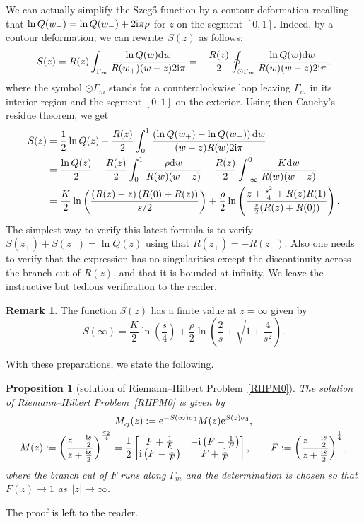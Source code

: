 \documentclass[10pt,a4paper]{amsart}
\numberwithin{equation}{section}
\newtheorem{Proposition}[Theorem]{Proposition}
\theoremstyle{definition}
\newtheorem{Remark}[Theorem]{Remark}
\def\red#1{\textcolor[rgb]{0.9, 0, 0}{#1} }
\def\le{\left}
\def\ri{\right}
\def \d{{\mathrm d}}
\def\s{\sigma}
\begin{document}
We can actually simplify the Szeg\H{o} function by a contour deformation recalling that $\ln Q(w_+)\allowbreak= \ln Q(w_-) + 2{\rm i}\pi { {\rho}}$ for $z$ on the segment $[0,1]$. Indeed, by a contour deformation, we can rewrite~$S(z)$ as follows:
\[
S(z) = R(z) \int_{\Gamma_m} \frac {\ln Q(w) \d w} {R(w_+) (w-z) 2{\rm i}\pi}
= - \frac{R(z)}2 \oint_{\odot \Gamma_m} \frac {\ln Q(w) \d w} {R(w) (w-z) 2{\rm i}\pi},
\]
where the symbol $\odot \Gamma_m$ stands for a counterclockwise loop leaving $\Gamma_m$ in its interior region and the segment $[0,1]$ on the exterior. Using then Cauchy's residue theorem, we get
\begin{align}
S(z) ={}& \frac 1 2 \ln Q(z) - \frac {R(z)}2 \int_0^1 \frac {\le(\ln Q(w_+)- \ln Q(w_-)\ri)\d w}{(w-z)R(w) 2{\rm i}\pi}\nonumber
\\
={}& \frac {\ln Q(z)}2 - \frac{R(z)}2\int_0^1 \frac {{ {\rho}} \d w}{R(w)(w-z)}
- \frac{R(z)}2\int_{-\infty}^0 \frac {{ {K}} \d w}{R(w)(w-z)}
\nonumber
\\={}&
\frac{ {K}}2
\ln\le(\frac {\le (R(z)-z\ri)\le(R(0)+ R(z) \ri)}{s/2}\ri)
+
\frac{ {\rho}}2 \ln\le(
 {\frac { z+ \frac {s^2}4 + R(z) R(1) }{ \frac s2 (R(z) + R(0)
 ) }}
 \ri).
 \label{S(z)}
\end{align}
The simplest way to verify this latest formula is to verify $S(z_+)+S(z_-)=\ln Q(z)$ using that $R(z_+)=-R(z_-)$. Also one needs to verify that the expression has no singularities except the discontinuity across the branch cut of $R(z)$, and that it is bounded at infinity. We leave the instructive but tedious verification to the reader.
\begin{Remark}
The function $S(z)$ has a finite value at $z=\infty$ given by
\[
S(\infty) = \frac { {K}} 2 \ln \le(\frac s4 \ri) + \frac { {\rho}} 2 \ln \le(\frac 2 s + \sqrt{1 + \frac 4{s^2}} \ri).
\]
\end{Remark}
With these preparations, we state the following.

\begin{Proposition}[solution of Riemann--Hilbert Problem~\ref{RHPM0}]
\label{modelMg0}
The solution of Riemann--Hilbert Problem~{\rm\ref{RHPM0}} is given by
\begin{gather}
M_{_Q}(z) := {\rm e}^{-S(\infty)\s_3} M(z) {\rm e}^{S(z) \s_3},\label{defMQ}\\
M(z):= \le(\frac {z-\frac {{\rm i}s}2}{z+\frac {{\rm i}s}2}\ri)^{\frac {\s_2}4}
= \frac 1 2\begin{bmatrix}
{F} + \frac 1 {F} & -{\rm i}\le({F}-\frac 1 {F}\ri)\\
{\rm i}\le({F} - \frac 1 {F}\ri) & {F} + \frac 1 {F}
\end{bmatrix},
\qquad
{F} := \le(\frac {z-\frac {{\rm i}s}2}{z+ \frac {{\rm i}s}2} \ri)^\frac 14,\nonumber
\end{gather}
where the branch cut of ${F}$ runs along $\Gamma_m$ and the determination is chosen so that ${F}(z) \to 1 $ as~${|z|\to \infty}$.
\end{Proposition}
The proof is left to the reader.
\end{document}
